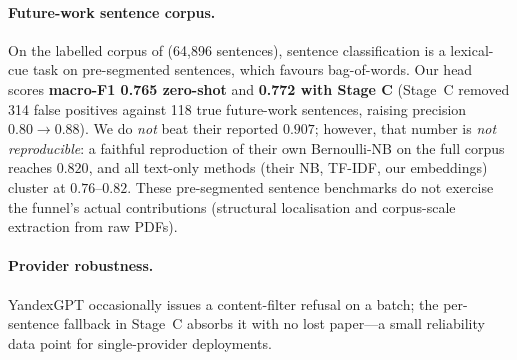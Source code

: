 \paragraph{Future-work sentence corpus.} On the labelled corpus of
\citet{zhangfws2022} (64{,}896 sentences), sentence classification is a
lexical-cue task on pre-segmented sentences, which favours bag-of-words. Our head
scores \textbf{macro-F1 0.765 zero-shot} and \textbf{0.772 with Stage C} (Stage~C
removed 314 false positives against 118 true future-work sentences, raising
precision $0.80 \rightarrow 0.88$). We do \emph{not} beat their reported $0.907$;
however, that number is \emph{not reproducible}: a faithful reproduction of their
own Bernoulli-NB on the full corpus reaches $0.820$, and all text-only methods
(their NB, TF-IDF, our embeddings) cluster at $0.76$--$0.82$. These pre-segmented
sentence benchmarks do not exercise the funnel's actual contributions (structural
localisation and corpus-scale extraction from raw PDFs).

\paragraph{Provider robustness.} YandexGPT occasionally issues a content-filter
refusal on a batch; the per-sentence fallback in Stage~C absorbs it with no lost
paper---a small reliability data point for single-provider deployments.
